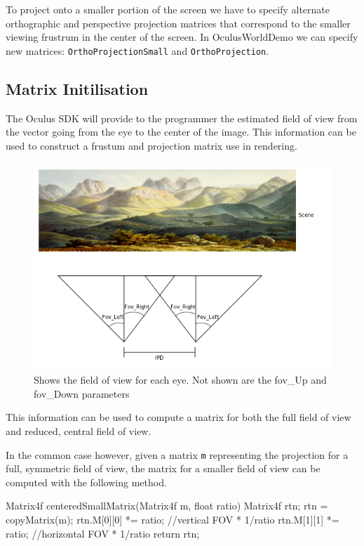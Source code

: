 \documentclass[12pt,a4paper,twoside,openright]{report}
\begin{document}
To project onto a smaller portion of the screen we have to specify alternate orthographic and perspective projection matrices that correspond to the smaller viewing frustrum in the center of the screen. In OculusWorldDemo we can specify new matrices: \texttt{OrthoProjectionSmall} and \texttt{OrthoProjection}. 

\subsection{Matrix Initilisation}

The Oculus SDK will provide to the programmer the estimated field of view from the vector going from the eye to the center of the image. This information can be used to construct a frustum and projection matrix use in rendering.

\begin{figure}[tbh]
\centerline{\includegraphics[scale=0.6]{figs/asymmetrical_fov.png}}
\caption{Shows the field of view for each eye. Not shown are the fov\_Up and fov\_Down parameters}
\label{epsfig1}
\end{figure}

This information can be used to compute a matrix for both the full field of view and reduced, central field of view.

In the common case however, given a matrix \texttt{m} representing the projection for a full, symmetric field of view, the matrix for a smaller field of view can be computed with the following method.

\begin{blockcode}
Matrix4f centeredSmallMatrix(Matrix4f m, float ratio){
    Matrix4f rtn; 
    rtn = copyMatrix(m);
    rtn.M[0][0] *= ratio; //vertical FOV * 1/ratio
    rtn.M[1][1] *= ratio; //horizontal FOV * 1/ratio
    return rtn;
}
\end{blockcode}
\end{document}
